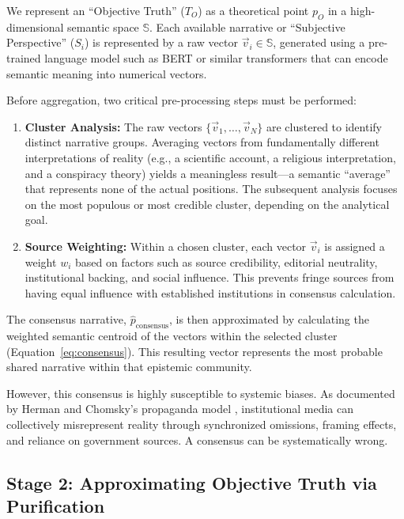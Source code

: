 \documentclass[11pt,a4paper]{article}
\begin{document}
We represent an ``Objective Truth'' ($T_O$) as a theoretical point $p_O$ in a high-dimensional semantic space $\mathbb{S}$. Each available narrative or ``Subjective Perspective'' ($S_i$) is represented by a raw vector $\vec{v}_i \in \mathbb{S}$, generated using a pre-trained language model such as BERT \citep{Devlin2018} or similar transformers that can encode semantic meaning into numerical vectors.

Before aggregation, two critical pre-processing steps must be performed:

\begin{enumerate}[leftmargin=*]
    \item \textbf{Cluster Analysis:} The raw vectors $\{\vec{v}_1, \ldots, \vec{v}_N\}$ are clustered to identify distinct narrative groups. Averaging vectors from fundamentally different interpretations of reality (e.g., a scientific account, a religious interpretation, and a conspiracy theory) yields a meaningless result---a semantic ``average'' that represents none of the actual positions. The subsequent analysis focuses on the most populous or most credible cluster, depending on the analytical goal.
    
    \item \textbf{Source Weighting:} Within a chosen cluster, each vector $\vec{v}_i$ is assigned a weight $w_i$ based on factors such as source credibility, editorial neutrality, institutional backing, and social influence. This prevents fringe sources from having equal influence with established institutions in consensus calculation.
\end{enumerate}

The consensus narrative, $\hat{p}_{\text{consensus}}$, is then approximated by calculating the weighted semantic centroid of the vectors within the selected cluster (Equation~\ref{eq:consensus}). This resulting vector represents the most probable shared narrative within that epistemic community.

However, this consensus is highly susceptible to systemic biases. As documented by Herman and Chomsky's propaganda model \citep{Herman1988}, institutional media can collectively misrepresent reality through synchronized omissions, framing effects, and reliance on government sources. A consensus can be systematically wrong.

\subsection{Stage 2: Approximating Objective Truth via Purification}
\end{document}
